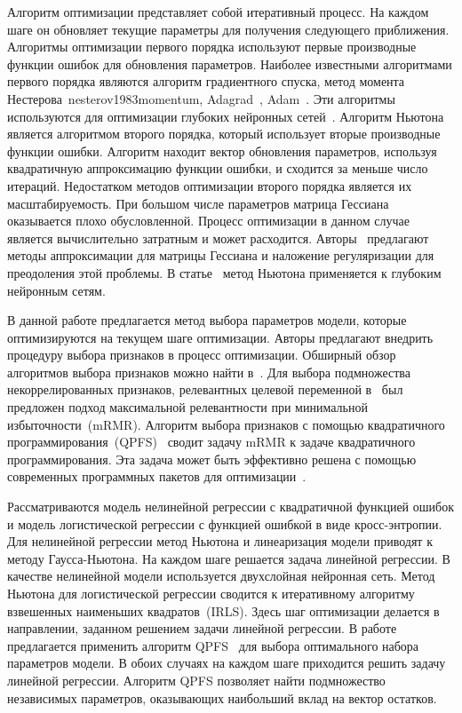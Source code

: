 \documentclass[a4paper,12pt]{article}
\theoremstyle{plain} %
\theoremstyle{definition} %
\theoremstyle{remark} %
\begin{document}
	Алгоритм оптимизации представляет собой итеративный процесс. 
	На каждом шаге он обновляет текущие параметры для получения следующего приближения.
	Алгоритмы оптимизации первого порядка используют первые производные функции ошибок для обновления параметров. 
	Наиболее известными алгоритмами первого порядка являются алгоритм градиентного спуска, метод момента Нестерова~{nesterov1983momentum}, Adagrad~\cite{duchi2011adagrad}, Adam~\cite{kingma2014adam}. 
	Эти алгоритмы используются для оптимизации глубоких нейронных сетей~\cite{goodfellow2016deeplearningbook}. 
	Алгоритм Ньютона является алгоритмом второго порядка, который использует вторые производные функции ошибки. 
	Алгоритм находит вектор обновления параметров, используя квадратичную аппроксимацию функции ошибки, и сходится за меньше число итераций.
	Недостатком методов оптимизации второго порядка является их масштабируемость.
	При большом числе параметров матрица Гессиана оказывается плохо обусловленной. 
	Процесс оптимизации в данном случае является вычислительно затратным и может расходится. 
	Авторы~\cite{avriel2003nonlinear, blaschke1997convergence} предлагают методы аппроксимации для матрицы Гессиана и наложение регуляризации для преодоления этой проблемы.
	В статье~\cite{botev2017newtondeeplearning} метод Ньютона применяется к глубоким нейронным сетям.
	
	В данной работе предлагается метод выбора параметров модели, которые оптимизируются на текущем шаге оптимизации.
	Авторы предлагают внедрить процедуру выбора признаков в процесс оптимизации.
	Обширный обзор алгоритмов выбора признаков можно найти в~\cite{li2017feature}.
	Для выбора подмножества некоррелированных признаков, релевантных целевой переменной в~\cite{ding2005mrmr,yamada2014mrmr,peng2005feature} был предложен подход максимальной релевантности при минимальной избыточности~(mRMR).
	Алгоритм выбора признаков с помощью квадратичного программирования~(QPFS)~\cite{katrutsa2017comprehensive,rodriguez2010qpfs} сводит задачу mRMR к задаче квадратичного программирования. Эта задача может быть эффективно решена с помощью современных программных пакетов для оптимизации~\cite{bertsimas2016best}.
	
	Рассматриваются модель нелинейной регрессии с квадратичной функцией ошибок и модель логистической регрессии с функцией ошибкой в виде кросс-энтропии.
	Для нелинейной регрессии метод Ньютона и линеаризация модели приводят к методу Гаусса-Ньютона. 
	На каждом шаге решается задача линейной регрессии. 
	В качестве нелинейной модели используется двухслойная нейронная сеть. 
	Метод Ньютона для логистической регрессии сводится к итеративному алгоритму взвешенных наименьших квадратов~(IRLS). 
	Здесь шаг оптимизации делается в направлении, заданном решением задачи линейной регрессии.
	В работе предлагается применить алгоритм QPFS~\cite{katrutsa2017comprehensive, rodriguez2010qpfs} для выбора оптимального набора параметров модели. В обоих случаях на каждом шаге приходится решить задачу линейной регрессии. 
	Алгоритм QPFS позволяет найти подмножество независимых параметров, оказывающих наибольший вклад на вектор остатков.
	
\end{document}
